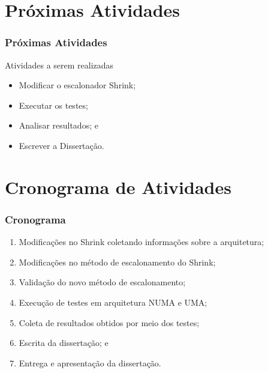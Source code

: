 \documentclass[10pt, pdf,xcolor=pdftex,dvipsnames,table]{beamer}
\begin{document}
\section{Próximas Atividades}
\begin{frame} \frametitle{Próximas Atividades}
\begin{block}{Atividades a serem realizadas}
\begin{itemize}
	\item Modificar o escalonador Shrink;
	\item Executar os testes;
	\item Analisar resultados; e
	\item Escrever a Dissertação.
\end{itemize}
\end{block}
\end{frame}

\section{Cronograma de Atividades}

\begin{frame} \frametitle{Cronograma}
\begin{enumerate}
	\item Modificações no Shrink coletando informações sobre a arquitetura;
	\item Modificações no método de escalonamento do Shrink;
	\item Validação do novo método de escalonamento;
	\item Execução de testes em arquitetura NUMA e UMA;
	\item Coleta de resultados obtidos por meio dos testes;
	\item Escrita da dissertação; e
	\item Entrega e apresentação da dissertação.
\end{enumerate}
\end{frame}
\end{document}
